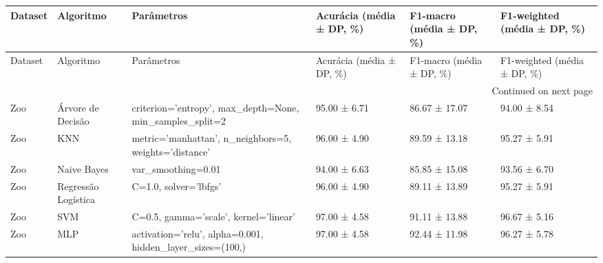 \begin{longtable}{llllll}
\toprule
Dataset & Algoritmo & Parâmetros & Acurácia (média ± DP, \%) & F1-macro (média ± DP, \%) & F1-weighted (média ± DP, \%) \\
\midrule
\endfirsthead
\toprule
Dataset & Algoritmo & Parâmetros & Acurácia (média ± DP, \%) & F1-macro (média ± DP, \%) & F1-weighted (média ± DP, \%) \\
\midrule
\endhead
\midrule
\multicolumn{6}{r}{Continued on next page} \\
\midrule
\endfoot
\bottomrule
\endlastfoot
Zoo & Árvore de Decisão & criterion='entropy', max\_depth=None, min\_samples\_split=2 & 95.00 ± 6.71 & 86.67 ± 17.07 & 94.00 ± 8.54 \\
Zoo & KNN & metric='manhattan', n\_neighbors=5, weights='distance' & 96.00 ± 4.90 & 89.59 ± 13.18 & 95.27 ± 5.91 \\
Zoo & Naive Bayes & var\_smoothing=0.01 & 94.00 ± 6.63 & 85.85 ± 15.08 & 93.56 ± 6.70 \\
Zoo & Regressão Logística & C=1.0, solver='lbfgs' & 96.00 ± 4.90 & 89.11 ± 13.89 & 95.27 ± 5.91 \\
Zoo & SVM & C=0.5, gamma='scale', kernel='linear' & 97.00 ± 4.58 & 91.11 ± 13.88 & 96.67 ± 5.16 \\
Zoo & MLP & activation='relu', alpha=0.001, hidden\_layer\_sizes=(100,) & 97.00 ± 4.58 & 92.44 ± 11.98 & 96.27 ± 5.78 \\
\end{longtable}
